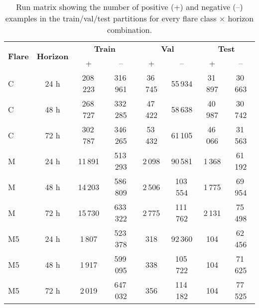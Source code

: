 \begin{table}[ht]\centering
\caption{Run matrix showing the number of positive (+) and negative (–) examples in the train/val/test partitions for every flare class $\times$ horizon combination.}
\label{tab:run_matrix}
\begin{tabular}{lccccccc}
\toprule
\multirow{2}{*}{\textbf{Flare}} & \multirow{2}{*}{\textbf{Horizon}} &
\multicolumn{2}{c}{\textbf{Train}} & \multicolumn{2}{c}{\textbf{Val}} &
\multicolumn{2}{c}{\textbf{Test}}\\
& & + & -- & + & -- & + & -- \\
\midrule
C & 24 h & 208\,223 & 316\,961 & 36\,745 & 55\,934 & 31\,897 & 30\,663 \\[-0.1em]
C & 48 h & 268\,727 & 332\,285 & 47\,422 & 58\,638 & 40\,987 & 30\,742 \\[-0.1em]
C & 72 h & 302\,787 & 346\,265 & 53\,432 & 61\,105 & 46\,066 & 31\,563 \\[-0.1em]
\addlinespace
M & 24 h & 11\,891 & 513\,293 & 2\,098 & 90\,581 & 1\,368 & 61\,192 \\[-0.1em]
M & 48 h & 14\,203 & 586\,809 & 2\,506 & 103\,554 & 1\,775 & 69\,954 \\[-0.1em]
M & 72 h & 15\,730 & 633\,322 & 2\,775 & 111\,762 & 2\,131 & 75\,498 \\[-0.1em]
\addlinespace
M5 & 24 h & 1\,807 & 523\,378 & 318 & 92\,360 & 104 & 62\,456 \\[-0.1em]
M5 & 48 h & 1\,917 & 599\,095 & 338 & 105\,722 & 104 & 71\,625 \\[-0.1em]
M5 & 72 h & 2\,019 & 647\,032 & 356 & 114\,182 & 104 & 77\,525 \\[-0.1em]
\bottomrule
\end{tabular}
\end{table}